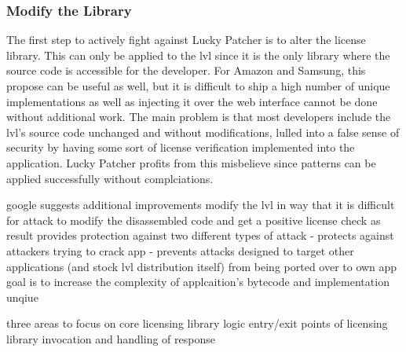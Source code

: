 \subsubsection{Modify the Library} \label{subsection:counter-modifications-library}
The first step to actively fight against Lucky Patcher is to alter the license library.
This can only be applied to the \gls{lvl} since it is the only library where the source code is accessible for the developer.
For Amazon and Samsung, this propose can be useful as well, but it is difficult to ship a high number of unique implementations as well as injecting it over the web interface cannot be done without additional work.
\newline
The main problem is that most developers include the \gls{lvl}'s source code unchanged and without modifications, lulled into a false sense of security by having some sort of license verification implemented into the application.
Lucky Patcher profits from this misbelieve since patterns can be applied successfully without complciations.


%
google suggests additional improvements \cite{developersSecuring}
modify the \gls{lvl} in way that it is difficult for attack to modify the disassembled code and get a positive license check as result \cite{developersSecuring}
provides protection against two different types of attack \cite{developersSecuring}
- protects against attackers trying to crack app \cite{developersSecuring}
- prevents attacks designed to target other applications (and stock lvl distribution itself) from being ported over to own app \cite{developersSecuring}
goal is to increase the complexity of applcaition's bytecode and implementation unqiue \cite{developersSecuring}

three areas to focus on \cite{developersSecuring}
core licensing library logic \cite{developersSecuring}
entry/exit points of licensing library \cite{developersSecuring}
invocation and handling of response \cite{developersSecuring}

